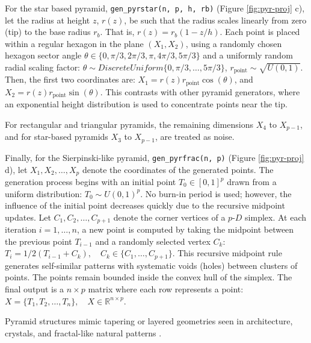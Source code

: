 For the star based pyramid, \texttt{gen\_pyrstar(n,\ p,\ h,\ rb)} (Figure \ref{fig:pyr-proj} c), let the radius at height \(z\), \(r(z)\), be such that the radius scales linearly from zero (tip) to the base radius \(r_b\). That is, \(r(z) = r_b\left(1 - z/h\right)\). Each point is placed within a regular hexagon in the plane \((X_1, X_2)\), using a randomly chosen hexagon sector angle \(\theta \in \{0, \pi/3, 2\pi/3, \pi, 4\pi/3, 5\pi/3\}\) and a uniformly random radial scaling factor: \(\theta \sim DiscreteUniform\{0, \pi/3, \dots, 5\pi/3\}\), \(r_{\text{point}} \sim \sqrt{U(0, 1)}\). Then, the first two coordinates are: \(X_1 = r(z)r_{\text{point}}\cos(\theta)\), and \(X_2 = r(z)r_{\text{point}}\sin(\theta)\). This contrasts with other pyramid generators, where an exponential height distribution is used to concentrate points near the tip.

For rectangular and triangular pyramids, the remaining dimensions \(X_4\) to \(X_{p-1}\), and for star-based pyramids \(X_3\) to \(X_{p-1}\), are treated as noise.

Finally, for the Sierpinski-like pyramid, \texttt{gen\_pyrfrac(n,\ p)} (Figure \ref{fig:pyr-proj} d), let \(X_1, X_2, \dots, X_p\) denote the coordinates of the generated points. The generation process begins with an initial point \(T_0 \in [0, 1]^p\) drawn from a uniform distribution: \(T_0 \sim U(0, 1)^p\). No burn-in period is used; however, the influence of the initial point decreases quickly due to the recursive midpoint updates. Let \(C_1, C_2, \dots, C_{p+1}\) denote the corner vertices of a \(p\text{-}D\) simplex. At each iteration \(i = 1, \dots, n\), a new point is computed by taking the midpoint between the previous point \(T_{i-1}\) and a randomly selected vertex \(C_k\): \(T_i = 1/2(T_{i-1} + C_k), \quad C_k \in \{C_1, \dots, C_{p+1}\}\). This recursive midpoint rule generates self-similar patterns with systematic voids (holes) between clusters of points. The points remain bounded inside the convex hull of the simplex. The final output is a \(n \times p\) matrix where each row represents a point: \(X = \{T_1, T_2, \dots, T_n\}, \quad X \in \mathbb{R}^{n \times p}\).

Pyramid structures mimic tapering or layered geometries seen in architecture, crystals, and fractal-like natural patterns \citep{kirkby1983}.

